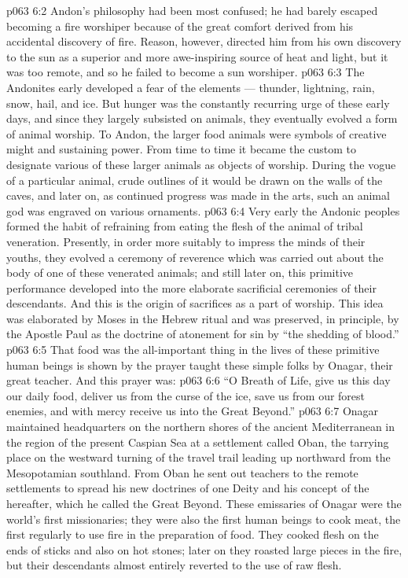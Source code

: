 \vs p063 6:2 \pc Andon’s philosophy had been most confused; he had barely escaped becoming a fire worshiper because of the great comfort derived from his accidental discovery of fire. Reason, however, directed him from his own discovery to the sun as a superior and more awe\hyp{}inspiring source of heat and light, but it was too remote, and so he failed to become a sun worshiper.
\vs p063 6:3 The Andonites early developed a fear of the elements --- thunder, lightning, rain, snow, hail, and ice. But hunger was the constantly recurring urge of these early days, and since they largely subsisted on animals, they eventually evolved a form of animal worship. To Andon, the larger food animals were symbols of creative might and sustaining power. From time to time it became the custom to designate various of these larger animals as objects of worship. During the vogue of a particular animal, crude outlines of it would be drawn on the walls of the caves, and later on, as continued progress was made in the arts, such an animal god was engraved on various ornaments.
\vs p063 6:4 Very early the Andonic peoples formed the habit of refraining from eating the flesh of the animal of tribal veneration. Presently, in order more suitably to impress the minds of their youths, they evolved a ceremony of reverence which was carried out about the body of one of these venerated animals; and still later on, this primitive performance developed into the more elaborate sacrificial ceremonies of their descendants. And this is the origin of sacrifices as a part of worship. This idea was elaborated by Moses in the Hebrew ritual and was preserved, in principle, by the Apostle Paul as the doctrine of atonement for sin by “the shedding of blood.”
\vs p063 6:5 That food was the all\hyp{}important thing in the lives of these primitive human beings is shown by the prayer taught these simple folks by Onagar, their great teacher. And this prayer was:
\vs p063 6:6 “O Breath of Life, give us this day our daily food, deliver us from the curse of the ice, save us from our forest enemies, and with mercy receive us into the Great Beyond.”
\vs p063 6:7 \pc Onagar maintained headquarters on the northern shores of the ancient Mediterranean in the region of the present Caspian Sea at a settlement called Oban, the tarrying place on the westward turning of the travel trail leading up northward from the Mesopotamian southland. From Oban he sent out teachers to the remote settlements to spread his new doctrines of one Deity and his concept of the hereafter, which he called the Great Beyond. These emissaries of Onagar were the world’s first missionaries; they were also the first human beings to cook meat, the first regularly to use fire in the preparation of food. They cooked flesh on the ends of sticks and also on hot stones; later on they roasted large pieces in the fire, but their descendants almost entirely reverted to the use of raw flesh.
